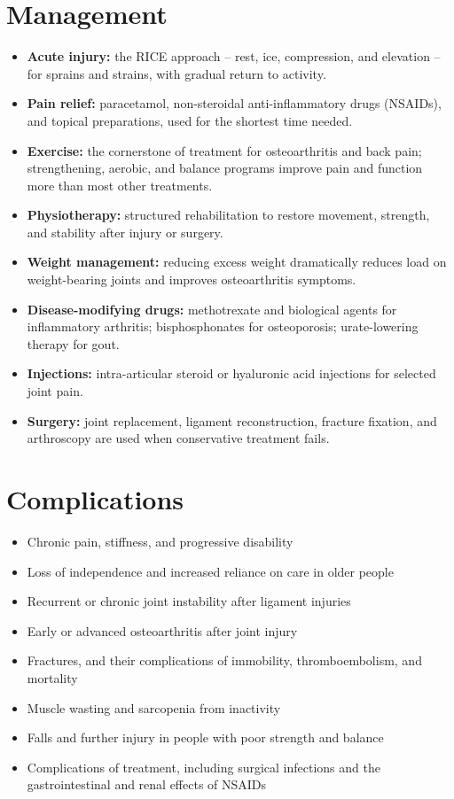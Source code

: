 \section*{Management}
\begin{itemize}
    \item \textbf{Acute injury:} the RICE approach -- rest, ice, compression, and elevation -- for sprains and strains, with gradual return to activity.
    \item \textbf{Pain relief:} paracetamol, non-steroidal anti-inflammatory drugs (NSAIDs), and topical preparations, used for the shortest time needed.
    \item \textbf{Exercise:} the cornerstone of treatment for osteoarthritis and back pain; strengthening, aerobic, and balance programs improve pain and function more than most other treatments.
    \item \textbf{Physiotherapy:} structured rehabilitation to restore movement, strength, and stability after injury or surgery.
    \item \textbf{Weight management:} reducing excess weight dramatically reduces load on weight-bearing joints and improves osteoarthritis symptoms.
    \item \textbf{Disease-modifying drugs:} methotrexate and biological agents for inflammatory arthritis; bisphosphonates for osteoporosis; urate-lowering therapy for gout.
    \item \textbf{Injections:} intra-articular steroid or hyaluronic acid injections for selected joint pain.
    \item \textbf{Surgery:} joint replacement, ligament reconstruction, fracture fixation, and arthroscopy are used when conservative treatment fails.
\end{itemize}

\section*{Complications}
\begin{itemize}
    \item Chronic pain, stiffness, and progressive disability
    \item Loss of independence and increased reliance on care in older people
    \item Recurrent or chronic joint instability after ligament injuries
    \item Early or advanced osteoarthritis after joint injury
    \item Fractures, and their complications of immobility, thromboembolism, and mortality
    \item Muscle wasting and sarcopenia from inactivity
    \item Falls and further injury in people with poor strength and balance
    \item Complications of treatment, including surgical infections and the gastrointestinal and renal effects of NSAIDs
\end{itemize}

